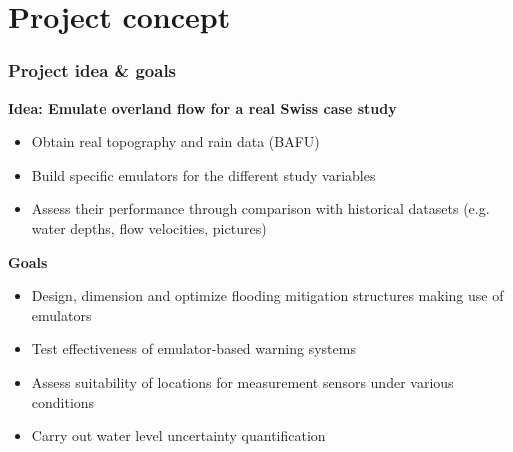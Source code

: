 \documentclass[xcolor=dvipsnames, USenglish]{beamer}  %
\begin{document}

\section{Project concept}
  \begin{frame}
    \frametitle{Project idea \& goals}
    \textbf{Idea: Emulate overland flow for a real Swiss case study}\\
    \begin{itemize}
      \item Obtain real topography and rain data (BAFU)
      \item Build specific emulators for the different study variables
      \item Assess their performance through comparison with historical datasets 
        (e.g. water depths, flow velocities, pictures)
    \end{itemize}
    \textbf{Goals}
    \begin{itemize}
      \item Design, dimension and optimize flooding mitigation structures making use of emulators
      \item Test effectiveness of emulator-based warning systems
      \item Assess suitability of locations for measurement sensors under various conditions
      \item Carry out water level uncertainty quantification
    \end{itemize}
  \end{frame}
  
\end{document}
